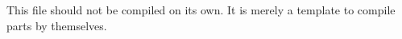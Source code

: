 \documentclass{memoir}
\begin{document}
This file should not be compiled on its own. It is merely a template to
compile parts by themselves.
\end{document}
